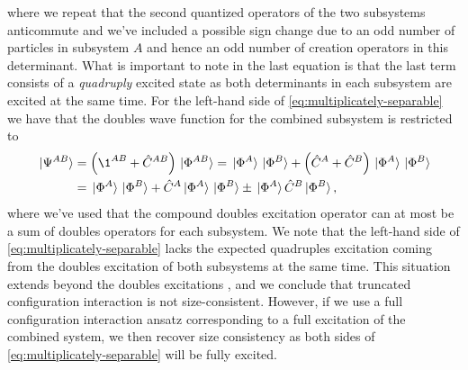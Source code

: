             where we repeat that the second quantized operators of the two
            subsystems anticommute and we've included a possible sign change due
            to an odd number of particles in subsystem $A$ and hence an odd
            number of creation operators in this determinant.
            What is important to note in the last equation is that the last term
            consists of a \emph{quadruply} excited state as both determinants in
            each subsystem are excited at the same time.
            For the left-hand side of \autoref{eq:multiplicately-separable} we
            have that the doubles wave function for the combined subsystem is
            restricted to
            \begin{align}
                \ket*{\Psi^{AB}}
                &= \para{\1^{AB} + \hat{C}^{AB}}\ket*{\slat^{AB}}
                = \ket*{\slat^{A}}\ket*{\slat^{B}}
                + \para{\hat{C}^{A} + \hat{C}^{B}}
                \ket*{\slat^{A}}\ket*{\slat^{B}}
                \\
                &=
                \ket*{\slat^{A}}\ket*{\slat^{B}}
                + \hat{C}^{A}\ket*{\slat^{A}}\ket*{\slat^{B}}
                \pm \ket*{\slat^{A}}\hat{C}^{B}\ket*{\slat^{B}},
            \end{align}
            where we've used that the compound doubles excitation operator can
            at most be a sum of doubles operators for each subsystem.
            We note that the left-hand side of
            \autoref{eq:multiplicately-separable} lacks the expected quadruples
            excitation coming from the doubles excitation of both subsystems at
            the same time.
            This situation extends beyond the doubles excitations
            \cite{size-extensivity}, and we conclude that truncated
            configuration interaction is not size-consistent.
            However, if we use a full configuration interaction ansatz
            corresponding to a full excitation of the combined system, we then
            recover size consistency as both sides of
            \autoref{eq:multiplicately-separable} will be fully excited.

